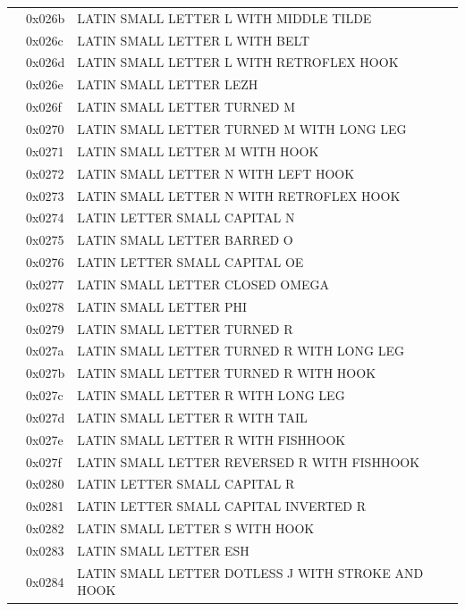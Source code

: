 \documentclass[12pt, twoside]{article}
\begin{document}
\begin{longtable}{L{1.0cm} L{2.0cm} >{\footnotesize}L{10cm}}
&0x026b&LATIN SMALL LETTER L WITH MIDDLE TILDE\\
&0x026c&LATIN SMALL LETTER L WITH BELT\\
&0x026d&LATIN SMALL LETTER L WITH RETROFLEX HOOK\\
&0x026e&LATIN SMALL LETTER LEZH\\
&0x026f&LATIN SMALL LETTER TURNED M\\
&0x0270&LATIN SMALL LETTER TURNED M WITH LONG LEG\\
&0x0271&LATIN SMALL LETTER M WITH HOOK\\
&0x0272&LATIN SMALL LETTER N WITH LEFT HOOK\\
&0x0273&LATIN SMALL LETTER N WITH RETROFLEX HOOK\\
&0x0274&LATIN LETTER SMALL CAPITAL N\\
&0x0275&LATIN SMALL LETTER BARRED O\\
&0x0276&LATIN LETTER SMALL CAPITAL OE\\
&0x0277&LATIN SMALL LETTER CLOSED OMEGA\\
&0x0278&LATIN SMALL LETTER PHI\\
&0x0279&LATIN SMALL LETTER TURNED R\\
&0x027a&LATIN SMALL LETTER TURNED R WITH LONG LEG\\
&0x027b&LATIN SMALL LETTER TURNED R WITH HOOK\\
&0x027c&LATIN SMALL LETTER R WITH LONG LEG\\
&0x027d&LATIN SMALL LETTER R WITH TAIL\\
&0x027e&LATIN SMALL LETTER R WITH FISHHOOK\\
&0x027f&LATIN SMALL LETTER REVERSED R WITH FISHHOOK\\
&0x0280&LATIN LETTER SMALL CAPITAL R\\
&0x0281&LATIN LETTER SMALL CAPITAL INVERTED R\\
&0x0282&LATIN SMALL LETTER S WITH HOOK\\
&0x0283&LATIN SMALL LETTER ESH\\
&0x0284&LATIN SMALL LETTER DOTLESS J WITH STROKE AND HOOK\\

\end{longtable}
\end{document}
